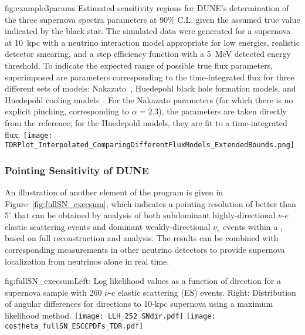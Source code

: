 \begin{dunefigure}{fig:example3params}{%
    Estimated sensitivity regions for DUNE’s determination of the three supernova spectra parameters at 90\% C.L. given the assumed true value indicated by the black star.  The simulated data were generated for a supernova at \SI{10}{kpc}
    with a neutrino interaction model appropriate for low energies, 
    realistic detector smearing, and a step efficiency function with a \SI{5}{\MeV}
    detected energy threshold. To indicate the expected range of possible true flux parameters, superimposed are parameters corresponding to the time-integrated flux for three different sets of models:
  Nakazato~\cite{Nakazato:2012qf}, Huedepohl black hole formation models, and Huedepohl
  cooling models~\cite{huedepohldb}.  For the Nakazato parameters (for which there is no
  explicit pinching, corresponding to $\alpha=2.3$), the parameters are
  taken directly from the reference; for the Huedepohl models, they are fit to a
  time-integrated flux.}
	\texttt{[image: TDRPlot\_Interpolated\_ComparingDifferentFluxModels\_ExtendedBounds.png]}
  \end{dunefigure}

\subsubsection{Pointing Sensitivity of DUNE}

An illustration 
of another element of the   program 
is given in Figure~\ref{fig:fullSN_execsum}, 
which indicates a pointing resolution of better than $5^\circ$ that 
can be obtained by analysis of both subdominant highly-directional $\nu$-$e$ elastic scattering 
events and dominant weakly-directional $\nu_e$  events within a , based 
on full reconstruction and analysis. The  results can be 
combined with corresponding measurements in other neutrino detectors to 
provide supernova localization from neutrinos alone in real time.
%
\begin{dunefigure}{fig:fullSN_execsum}{Left: Log
    likelihood values as a function of direction for a
    supernova sample with 260 $\nu$-$e$ elastic scattering (ES) events.  Right: Distribution of angular differences for
    directions to 10-kpc supernova using a maximum likelihood
    method.}
  \texttt{[image: LLH\_252\_SNdir.pdf]}
  \texttt{[image: costheta\_fullSN\_ESCCPDFs\_TDR.pdf]}
\end{dunefigure}

